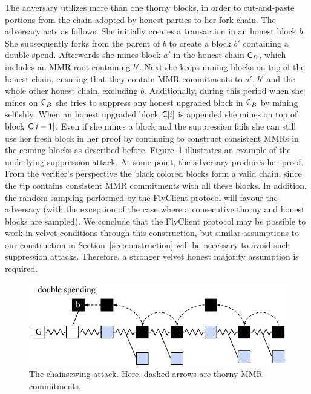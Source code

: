 	The adversary utilizes more than one thorny blocks, in order to cut-and-paste portions from the chain adopted by honest parties to her fork chain.
    The adversary acts as follows.
		She initially creates a transaction in an honest block $b$. She subsequently forks from the parent of $b$ to create a block $b'$ containing
		a double spend.
    Afterwards she mines block $a'$ in the honest chain $\mathsf{C}_B$, which includes an MMR root containing $b'$.
    Next she keeps mining blocks on top of the honest chain, ensuring that they contain MMR commitments to
		$a'$, $b'$ and the whole other honest chain, excluding $b$.
    Additionally, during this period when she mines on $\mathsf{C}_B$ she tries to suppress any honest upgraded block in $\mathsf{C}_B$ by mining selfishly.
    When an honest upgraded block $\mathsf{C}[i]$ is appended she mines on top of block $\mathsf{C}[i-1]$.
    Even if she mines a block and the suppression fails she can still use her fresh block in her proof by continuing to construct consistent MMRs
    in the coming blocks as described before.
		Figure~\ref{fig:combined_chainsewing_flyclient} illustrates an example of the underlying suppression attack.
    At some point, the adversary produces her proof.
    From the verifier's perspective the black colored blocks form a valid chain,
    since the tip contains consistent MMR commitments with all these blocks.
    In addition, the random sampling performed by the FlyClient protocol will favour the adversary
		(with the exception of the case where a consecutive thorny and honest blocks are sampled).
		We conclude that the FlyClient protocol may be possible to work in velvet conditions through this construction,
		but similar assumptions to our construction in Section~\ref{sec:construction} will be necessary to avoid such suppression attacks.
		Therefore, a stronger velvet honest majority assumption is required.

	\begin{figure}
		\begin{center}
			\includegraphics[width=0.95\columnwidth]{figures/attack_after_update-crop.pdf}
		\end{center}
		\caption{The chainsewing attack. Here, dashed arrows are thorny MMR commitments.}
		\label{fig:combined_chainsewing_flyclient}
	\end{figure}

